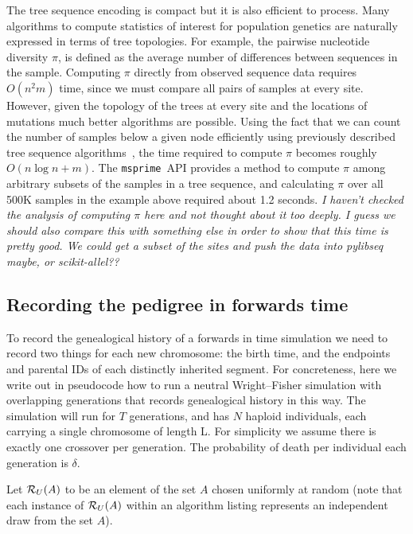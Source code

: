 \documentclass{article}
\newcommand{\msprime}{\texttt{msprime}}
\newcommand{\jk}[1]{{\em \color{red} #1}}
\begin{document}
The tree sequence encoding is compact but it is also efficient to process.
Many algorithms to compute statistics of interest for population genetics
are naturally expressed in terms of tree topologies. For example, the
pairwise nucleotide diversity $\pi$, is defined as the average number of
differences between sequences in the sample. Computing $\pi$ directly
from observed sequence data requires $O(n^2 m)$ time, since we must
compare all pairs of samples at every site. However, given the topology of
the trees at every site and the locations of mutations much better algorithms
are possible. Using the fact that we can count the number of samples below
a given node efficiently using previously described tree sequence
algorithms~\citep{kelleher2016efficient}, the time required to compute $\pi$
becomes roughly $O(n \log n + m)$.
The \msprime\ API provides a method to compute $\pi$ among arbitrary subsets of the
samples in a tree sequence, and calculating $\pi$ over all 500K samples
in the example above required about 1.2 seconds.
\jk{I haven't checked the analysis of computing $\pi$ here and not thought about
it too deeply. I guess we should also compare this with something else in order to
show that this time is pretty good. We could get a subset of the sites and push
the data into pylibseq maybe, or scikit-allel??}

\subsection*{Recording the pedigree in forwards time}

To record the genealogical history of a forwards in time simulation
we need to record two things for each new chromosome:
the birth time, and the endpoints and parental IDs of each distinctly inherited segment.
For concreteness, here we write out in pseudocode how to run a neutral Wright--Fisher simulation
with overlapping generations that records genealogical history in this way.
The simulation will run for $T$ generations,
and has $N$ haploid individuals, each carrying a single chromosome of length L.
For simplicity we assume there is exactly one crossover per generation.
The probability of death per individual each generation is $\delta$.

Let $\mathcal{R}_U(A)$ to be an element of the set $A$ chosen
uniformly at random (note that each instance of $\mathcal{R}_U(A)$ within
an algorithm listing represents an independent draw from the set $A$).
\end{document}
